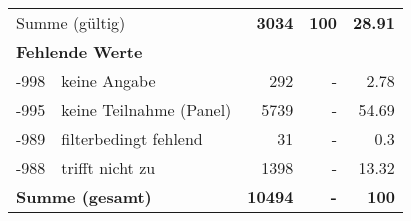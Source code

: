 \begin{longtable}{lXrrr}
     \midrule
     \multicolumn{2}{l}{Summe (gültig)} &
       \textbf{\num{3034}} &
     \textbf{100} &
       \textbf{\num[round-mode=places,round-precision=2]{28,91}} \\
     \multicolumn{5}{l}{\textbf{Fehlende Werte}}\\
       -998 &
       keine Angabe &
         \num{292} &
        - &
         \num[round-mode=places,round-precision=2]{2,78} \\
       -995 &
       keine Teilnahme (Panel) &
         \num{5739} &
        - &
         \num[round-mode=places,round-precision=2]{54,69} \\
       -989 &
       filterbedingt fehlend &
         \num{31} &
        - &
         \num[round-mode=places,round-precision=2]{0,3} \\
       -988 &
       trifft nicht zu &
         \num{1398} &
        - &
         \num[round-mode=places,round-precision=2]{13,32} \\
     \midrule
     \multicolumn{2}{l}{\textbf{Summe (gesamt)}} &
          \textbf{\num{10494}} &
        \textbf{-} &
        \textbf{100} \\
     \bottomrule
     \end{longtable}
     
